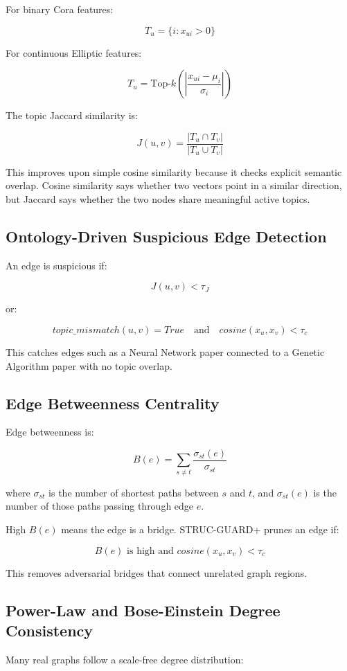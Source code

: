 \documentclass[12pt,a4paper]{article}
\begin{document}
For binary Cora features:

$$
T_u=\{i:x_{ui}>0\}
$$

For continuous Elliptic features:

$$
T_u=\text{Top-}k\left(\left|\frac{x_{ui}-\mu_i}{\sigma_i}\right|\right)
$$

The topic Jaccard similarity is:

$$
J(u,v)=\frac{|T_u\cap T_v|}{|T_u\cup T_v|}
$$

This improves upon simple cosine similarity because it checks explicit semantic overlap. Cosine similarity says whether two vectors point in a similar direction, but Jaccard says whether the two nodes share meaningful active topics.

\subsection{Ontology-Driven Suspicious Edge Detection}
An edge is suspicious if:

$$
J(u,v)<\tau_J
$$

or:

$$
topic\_mismatch(u,v)=True \quad \text{and} \quad cosine(x_u,x_v)<\tau_c
$$

This catches edges such as a Neural Network paper connected to a Genetic Algorithm paper with no topic overlap.

\subsection{Edge Betweenness Centrality}
Edge betweenness is:

$$
B(e)=\sum_{s\neq t}\frac{\sigma_{st}(e)}{\sigma_{st}}
$$

where $\sigma_{st}$ is the number of shortest paths between $s$ and $t$, and $\sigma_{st}(e)$ is the number of those paths passing through edge $e$.

High $B(e)$ means the edge is a bridge. STRUC-GUARD+ prunes an edge if:

$$
B(e)\text{ is high and } cosine(x_u,x_v)<\tau_c
$$

This removes adversarial bridges that connect unrelated graph regions.

\subsection{Power-Law and Bose-Einstein Degree Consistency}
Many real graphs follow a scale-free degree distribution:
\end{document}
